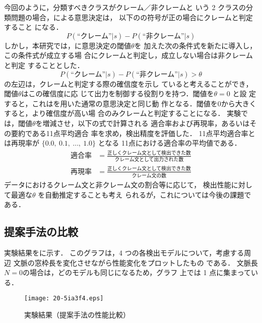 \documentclass[japanese]{jnlp_1.4}
\def\eq#1{}
\def\fig#1{}
\begin{document}
今回のように，分類すべきクラスがクレーム／非クレームと
いう 2 クラスの分類問題の場合，\eq{eq0}による意思決定は，
以下の\eq{deci}の符号が正の場合にクレームと判定すること
になる．
\begin{equation}
P(\text{``クレーム''}|s) - P(\text{``非クレーム''}|s)
\label{eq:deci}
\end{equation}
しかし，本研究では，\eq{deci}に意思決定の閾値$\theta$を
加えた次の条件式を新たに導入し，この条件式が成立する場
合にクレームと判定し，成立しない場合は非クレームと判定
することとした．
\begin{equation}
P(\text{``クレーム''}|s) - P(\text{``非クレーム''}|s) > \theta
\label{eq:deci2}
\end{equation}
\eq{deci2}の左辺は，クレームと判定する際の確信度を示し
ていると考えることができ，閾値$\theta$はこの確信度に応
じて出力を制御する役割りを持つ．閾値を$\theta = 0$ と設
定すると，これは\eq{deci}を用いた通常の意思決定と同じ動
作となる．閾値を$0$から大きくすると，より確信度が高い場
合のみクレームと判定することになる．
実験では，閾値$\theta$を増減させ，以下の式で計算される
適合率および再現率，あるいはその要約である11点平均適合
率\cite{iir}を求め，検出精度を評価した．
11点平均適合率とは再現率が $\{0.0,\ 0.1,\ \ldots ,\ 1.0\}$ となる
11点における適合率の平均値である．
\begin{align}
\mbox{適合率} &=\frac{\mbox{正しくクレーム文として検出できた数}}{\mbox{クレーム文として出力された数}} \\[1ex] 
\mbox{再現率} &=\frac{\mbox{正しくクレーム文として検出できた数}}{\mbox{クレーム文の数}}
\end{align}
データにおけるクレーム文と非クレーム文の割合等に応じて，
検出性能に対して最適な$\theta$ を自動推定することも考え
られるが，これについては今後の課題である．


\subsection{提案手法の比較}
\label{sec:exp_model}

実験結果を\fig{model_length}に示す．
このグラフは，4 つの各検出モデルについて，考慮する周辺
文脈の窓枠長を変化させながら性能変化をプロットしたもの
である．
文脈長$N=0$の場合は，どのモデルも同じになるため，グラフ
上では 1 点に集まっている．

\begin{figure}[b]
 \begin{center}
 \texttt{[image: 20-5ia3f4.eps]}
 \end{center}
 \caption{実験結果（提案手法の性能比較）}
 \label{fig:model_length}
\end{figure}
\end{document}
